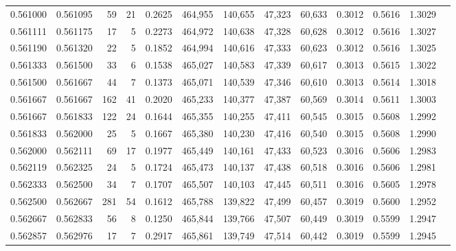 \begin{tabular}{rrrrrrrrrrrrr}
0.561000 & 0.561095 &    59 &  21 &                                     0.2625 & 464,955 & 140,655 &  47,323 &  60,633 & 0.3012 & 0.5616 & 1.3029 \\
0.561111 & 0.561175 &    17 &   5 &                                     0.2273 & 464,972 & 140,638 &  47,328 &  60,628 & 0.3012 & 0.5616 & 1.3027 \\
0.561190 & 0.561320 &    22 &   5 &                                     0.1852 & 464,994 & 140,616 &  47,333 &  60,623 & 0.3012 & 0.5616 & 1.3025 \\
0.561333 & 0.561500 &    33 &   6 &                                     0.1538 & 465,027 & 140,583 &  47,339 &  60,617 & 0.3013 & 0.5615 & 1.3022 \\
0.561500 & 0.561667 &    44 &   7 &                                     0.1373 & 465,071 & 140,539 &  47,346 &  60,610 & 0.3013 & 0.5614 & 1.3018 \\
0.561667 & 0.561667 &   162 &  41 &                                     0.2020 & 465,233 & 140,377 &  47,387 &  60,569 & 0.3014 & 0.5611 & 1.3003 \\
0.561667 & 0.561833 &   122 &  24 &                                     0.1644 & 465,355 & 140,255 &  47,411 &  60,545 & 0.3015 & 0.5608 & 1.2992 \\
0.561833 & 0.562000 &    25 &   5 &                                     0.1667 & 465,380 & 140,230 &  47,416 &  60,540 & 0.3015 & 0.5608 & 1.2990 \\
0.562000 & 0.562111 &    69 &  17 &                                     0.1977 & 465,449 & 140,161 &  47,433 &  60,523 & 0.3016 & 0.5606 & 1.2983 \\
0.562119 & 0.562325 &    24 &   5 &                                     0.1724 & 465,473 & 140,137 &  47,438 &  60,518 & 0.3016 & 0.5606 & 1.2981 \\
0.562333 & 0.562500 &    34 &   7 &                                     0.1707 & 465,507 & 140,103 &  47,445 &  60,511 & 0.3016 & 0.5605 & 1.2978 \\
0.562500 & 0.562667 &   281 &  54 &                                     0.1612 & 465,788 & 139,822 &  47,499 &  60,457 & 0.3019 & 0.5600 & 1.2952 \\
0.562667 & 0.562833 &    56 &   8 &                                     0.1250 & 465,844 & 139,766 &  47,507 &  60,449 & 0.3019 & 0.5599 & 1.2947 \\
0.562857 & 0.562976 &    17 &   7 &                                     0.2917 & 465,861 & 139,749 &  47,514 &  60,442 & 0.3019 & 0.5599 & 1.2945 \\

\end{tabular}
